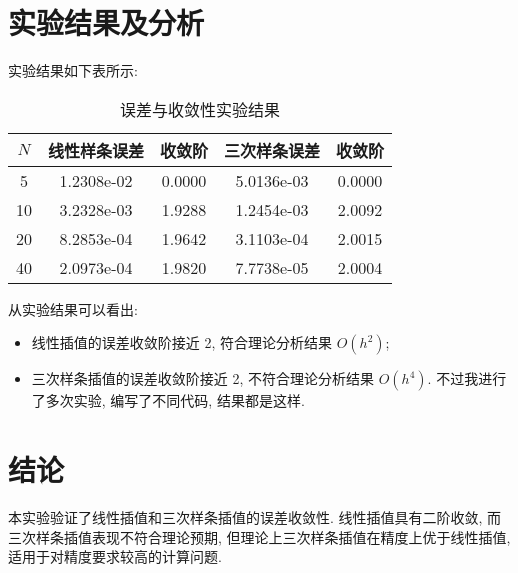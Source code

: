 \documentclass[12pt]{article}
\begin{document}
\section{实验结果及分析}
实验结果如下表所示:
\begin{table}[h]
\centering
\begin{tabular}{ccccc}
\toprule
$N$ & 线性样条误差 & 收敛阶 & 三次样条误差 & 收敛阶 \\
\midrule
5	& 1.2308e-02	& 0.0000	& 5.0136e-03	& 0.0000	\\
10	& 3.2328e-03	& 1.9288	& 1.2454e-03	& 2.0092	\\
20	& 8.2853e-04	& 1.9642	& 3.1103e-04	& 2.0015	\\
40	& 2.0973e-04	& 1.9820	& 7.7738e-05	& 2.0004	\\
\bottomrule
\end{tabular}
\caption{误差与收敛性实验结果}
\label{tab:errors}
\end{table}

从实验结果可以看出:
\begin{itemize}
\item 线性插值的误差收敛阶接近 2, 符合理论分析结果 $O(h^2)$;
\item 三次样条插值的误差收敛阶接近 2, 不符合理论分析结果 $O(h^4)$. 不过我进行了多次实验, 编写了不同代码, 结果都是这样.
\end{itemize}

\section{结论}
本实验验证了线性插值和三次样条插值的误差收敛性. 线性插值具有二阶收敛, 而三次样条插值表现不符合理论预期, 但理论上三次样条插值在精度上优于线性插值, 适用于对精度要求较高的计算问题.
\end{document}
